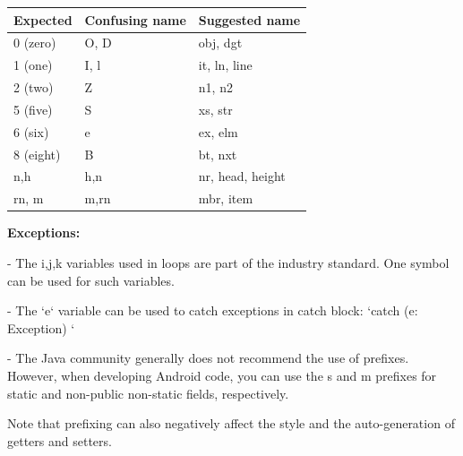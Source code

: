 \begin{center}

\begin{tabular}{ |p{}|p{}|p{}| }

\hline

Expected&Confusing name&Suggested name\\

\hline

 0 (zero)      & O, D                     & obj, dgt         \\

 1 (one)       & I, l                     & it, ln, line     \\

 2 (two)       & Z                        & n1, n2           \\

 5 (five)      & S                        & xs, str          \\

 6 (six)       & e                        & ex, elm          \\

 8 (eight)     & B                        & bt, nxt          \\

 n,h           & h,n                      & nr, head, height \\

 rn, m         & m,rn                     & mbr, item        \\

\hline

\end{tabular}

\end{center}

\textbf{Exceptions:}

- The i,j,k variables used in loops are part of the industry standard. One symbol can be used for such variables.

- The `e` variable can be used to catch exceptions in catch block: `catch (e: Exception) {}`

- The Java community generally does not recommend the use of prefixes. However, when developing Android code, you can use the s and m prefixes for static and non-public non-static fields, respectively.

Note that prefixing can also negatively affect the style and the auto-generation of getters and setters.



